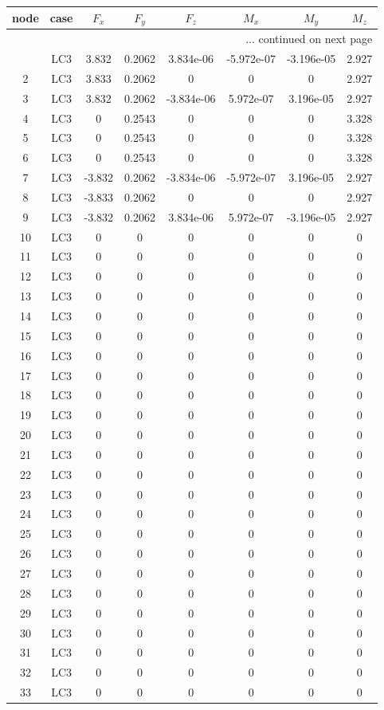 \documentclass{article}%
\begin{document}
\begin{longtable}{| c c | c c c c c c |}%
\hline%
node&case&$F_x$&$F_y$&$F_z$&$M_x$&$M_y$&$M_z$\\%
\hline%
\endhead%
\hline%
\multicolumn{8}{r}{... continued on next page}\\%
\endfoot%
\hline%
\endlastfoot%
1&LC3&3.832&0.2062&3.834e{-}06&{-}5.972e{-}07&{-}3.196e{-}05&2.927\\%
2&LC3&3.833&0.2062&0&0&0&2.927\\%
3&LC3&3.832&0.2062&{-}3.834e{-}06&5.972e{-}07&3.196e{-}05&2.927\\%
4&LC3&0&0.2543&0&0&0&3.328\\%
5&LC3&0&0.2543&0&0&0&3.328\\%
6&LC3&0&0.2543&0&0&0&3.328\\%
7&LC3&{-}3.832&0.2062&{-}3.834e{-}06&{-}5.972e{-}07&3.196e{-}05&2.927\\%
8&LC3&{-}3.833&0.2062&0&0&0&2.927\\%
9&LC3&{-}3.832&0.2062&3.834e{-}06&5.972e{-}07&{-}3.196e{-}05&2.927\\%
10&LC3&0&0&0&0&0&0\\%
11&LC3&0&0&0&0&0&0\\%
12&LC3&0&0&0&0&0&0\\%
13&LC3&0&0&0&0&0&0\\%
14&LC3&0&0&0&0&0&0\\%
15&LC3&0&0&0&0&0&0\\%
16&LC3&0&0&0&0&0&0\\%
17&LC3&0&0&0&0&0&0\\%
18&LC3&0&0&0&0&0&0\\%
19&LC3&0&0&0&0&0&0\\%
20&LC3&0&0&0&0&0&0\\%
21&LC3&0&0&0&0&0&0\\%
22&LC3&0&0&0&0&0&0\\%
23&LC3&0&0&0&0&0&0\\%
24&LC3&0&0&0&0&0&0\\%
25&LC3&0&0&0&0&0&0\\%
26&LC3&0&0&0&0&0&0\\%
27&LC3&0&0&0&0&0&0\\%
28&LC3&0&0&0&0&0&0\\%
29&LC3&0&0&0&0&0&0\\%
30&LC3&0&0&0&0&0&0\\%
31&LC3&0&0&0&0&0&0\\%
32&LC3&0&0&0&0&0&0\\%
33&LC3&0&0&0&0&0&0\\%

\end{longtable}
\end{document}
